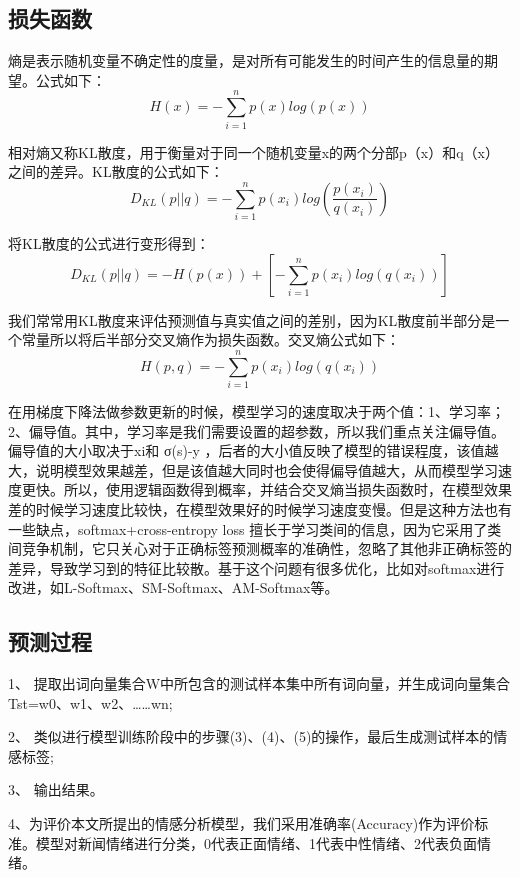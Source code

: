 \documentclass[twocolumn]{ctexart}
\begin{document}
\subsection{损失函数}
熵是表示随机变量不确定性的度量，是对所有可能发生的时间产生的信息量的期望。公式如下：
\begin{equation}
H(x) = -\sum_{i=1}^{n}p(x)log(p(x))
\end{equation}



\par 相对熵又称KL散度，用于衡量对于同一个随机变量x的两个分部p（x）和q（x）之间的差异。KL散度的公式如下：
\begin{equation}
D_{KL}(p||q)=-\sum_{i=1}^{n}p(x_i)log(\frac{p(x_i)}{q(x_i)})
\end{equation}
\par 将KL散度的公式进行变形得到：
\begin{equation}
D_{KL}(p||q)=-H(p(x))+[-\sum_{i=1}^{n}p(x_i)log(q(x_i))]
\end{equation}

\par 我们常常用KL散度来评估预测值与真实值之间的差别，因为KL散度前半部分是一个常量所以将后半部分交叉熵作为损失函数。交叉熵公式如下：
\begin{equation}
H(p,q)=-\sum_{i=1}^{n}p(x_i)log(q(x_i))
\end{equation}
\par 在用梯度下降法做参数更新的时候，模型学习的速度取决于两个值：1、学习率；2、偏导值。其中，学习率是我们需要设置的超参数，所以我们重点关注偏导值。偏导值的大小取决于xi和 σ(s)-y ，后者的大小值反映了模型的错误程度，该值越大，说明模型效果越差，但是该值越大同时也会使得偏导值越大，从而模型学习速度更快。所以，使用逻辑函数得到概率，并结合交叉熵当损失函数时，在模型效果差的时候学习速度比较快，在模型效果好的时候学习速度变慢。但是这种方法也有一些缺点，softmax+cross-entropy loss 擅长于学习类间的信息，因为它采用了类间竞争机制，它只关心对于正确标签预测概率的准确性，忽略了其他非正确标签的差异，导致学习到的特征比较散。基于这个问题有很多优化，比如对softmax进行改进，如L-Softmax、SM-Softmax、AM-Softmax等。

\subsection{预测过程}
\par 1、
提取出词向量集合W中所包含的测试样本集中所有词向量，并生成词向量集合Tst={w0、w1、w2、……wn};
\par 2、
类似进行模型训练阶段中的步骤(3)、(4)、(5)的操作，最后生成测试样本的情感标签;
\par 3、
输出结果。
\par 4、为评价本文所提出的情感分析模型，我们采用准确率(Accuracy)作为评价标准。模型对新闻情绪进行分类，0代表正面情绪、1代表中性情绪、2代表负面情绪。
\end{document}

